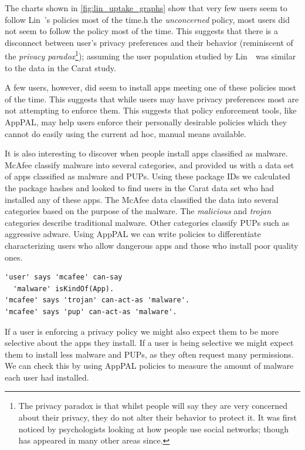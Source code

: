 \documentclass[thesis.tex]{subfiles}
\begin{document}
The charts shown in \autoref{fig:lin_uptake_graphs} show that very few
users seem to follow Lin~\etal's policies most of the
time.h
the \emph{unconcerned} policy, most users did not seem to follow the
policy most of the time.  This suggests that there is a disconnect
between user's privacy preferences and their behavior (reminiscent of
the \emph{privacy paradox}\footnote{The privacy paradox is that whilst
people will say they are very concerned about their privacy, they do
not alter their behavior to protect it.  It was first noticed by
psychologists looking at how people use social networks; though has
appeared in many other areas since.}); assuming the user population
studied by Lin~\etal~was similar to the data in the Carat study.

A few users, however, did seem to install apps meeting one of these
policies most of the time.  This suggests that while users may have
privacy preferences most are not attempting to enforce them.  This
suggests that policy enforcement tools, like AppPAL, may help users
enforce their personally desirable policies which they cannot do
easily using the current ad hoc, manual means available.

It is also interesting to discover when people install apps classified
as malware.  McAfee classify malware into several categories, and
provided us with a data set of apps classified as malware and
\acp{PUP}. Using these package IDs we calculated the package hashes
and looked to find users in the Carat data set who had installed any of
these apps.  The McAfee data classified the data into several
categories based on the purpose of the malware.  The \emph{malicious}
and \emph{trojan} categories describe traditional malware.  Other
categories classify \acp{PUP} such as aggressive adware.  Using AppPAL
we can write policies to differentiate characterizing users who allow
dangerous apps and those who install poor quality ones.

\begin{lstlisting}
'user' says 'mcafee' can-say
  'malware' isKindOf(App).
'mcafee' says 'trojan' can-act-as 'malware'.
'mcafee' says 'pup' can-act-as 'malware'.
\end{lstlisting}

If a user is enforcing a privacy policy we might also expect them to
be more selective about the apps they install.  If a user is being
selective we might expect them to install less malware and \acp{PUP},
as they often request many permissions. We can check this by using
AppPAL policies to measure the amount of malware each user had
installed.
\end{document}
